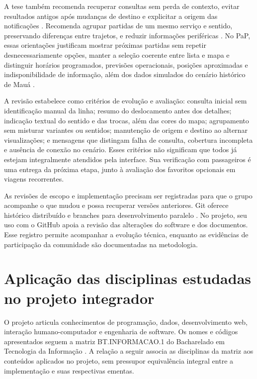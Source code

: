 \documentclass[12pt,oneside,a4paper,brazil,chapter=TITLE]{abntex2}
\let\papsection\section
\renewcommand{\section}{\clearpage\papsection}
\begin{document}
A tese também recomenda recuperar consultas sem perda de contexto, evitar resultados antigos após mudanças de destino e explicitar a origem das notificações \citep[p.~144--152]{haylett2018}. Recomenda agrupar partidas de um mesmo serviço e sentido, preservando diferenças entre trajetos, e reduzir informações periféricas \citep[p.~152--156]{haylett2018}. No PaP, essas orientações justificam mostrar próximas partidas sem repetir desnecessariamente opções, manter a seleção coerente entre lista e mapa e distinguir horários programados, previsões operacionais, posições aproximadas e indisponibilidade de informação, além dos dados simulados do cenário histórico de Mauá \citep{haylett2018}.

A revisão estabelece como critérios de evolução e avaliação: consulta inicial sem identificação manual da linha; resumo do deslocamento antes dos detalhes; indicação textual do sentido e das trocas, além das cores do mapa; agrupamento sem misturar variantes ou sentidos; manutenção de origem e destino ao alternar visualizações; e mensagens que distingam falha de consulta, cobertura incompleta e ausência de conexão no cenário. Esses critérios não significam que todos já estejam integralmente atendidos pela interface. Sua verificação com passageiros é uma entrega da próxima etapa, junto à avaliação dos favoritos opcionais em viagens recorrentes.

As revisões de escopo e implementação precisam ser registradas para que o grupo acompanhe o que mudou e possa recuperar versões anteriores. Git oferece histórico distribuído e branches para desenvolvimento paralelo \citep{git}. No projeto, seu uso com o GitHub apoia a revisão das alterações do software e dos documentos. Esse registro permite acompanhar a evolução técnica, enquanto as evidências de participação da comunidade são documentadas na metodologia.

\section{Aplicação das disciplinas estudadas no projeto integrador}
O projeto articula conhecimentos de programação, dados, desenvolvimento web, interação humano-computador e engenharia de software. Os nomes e códigos apresentados seguem a matriz BT.INFORMACAO.1 do Bacharelado em Tecnologia da Informação \citep{matriz2026}. A relação a seguir associa as disciplinas da matriz aos conteúdos aplicados no projeto, sem pressupor equivalência integral entre a implementação e suas respectivas ementas.
\end{document}
